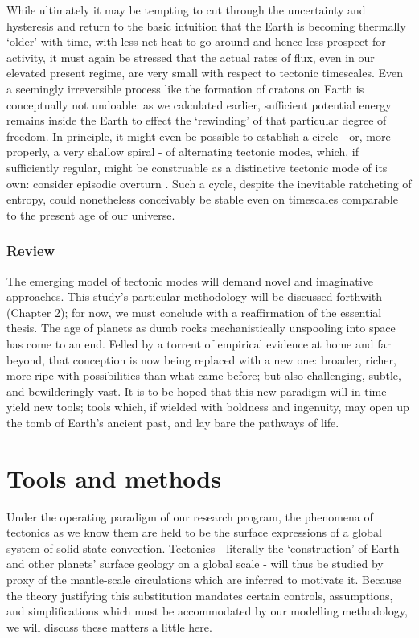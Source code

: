 \documentclass[a4paper,11pt,oneside]{book}
\renewcommand{\section}[1]{\chapter{#1}}
\begin{document}
While ultimately it may be tempting to cut through the uncertainty and hysteresis and return to the basic intuition that the Earth is becoming thermally `older' with time, with less net heat to go around and hence less prospect for activity, it must again be stressed that the actual rates of flux, even in our elevated present regime, are very small with respect to tectonic timescales. Even a seemingly irreversible process like the formation of cratons on Earth is conceptually not undoable: as we calculated earlier, sufficient potential energy remains inside the Earth to effect the `rewinding' of that particular degree of freedom. In principle, it might even be possible to establish a circle - or, more properly, a very shallow spiral - of alternating tectonic modes, which, if sufficiently regular, might be construable as a distinctive tectonic mode of its own: consider episodic overturn \cite{Moresi1998-az}. Such a cycle, despite the inevitable ratcheting of entropy, could nonetheless conceivably be stable even on timescales comparable to the present age of our universe.

\subsection{Review}

The emerging model of tectonic modes will demand novel and imaginative approaches. This study's particular methodology will be discussed forthwith (Chapter 2); for now, we must conclude with a reaffirmation of the essential thesis. The age of planets as dumb rocks mechanistically unspooling into space has come to an end. Felled by a torrent of empirical evidence at home and far beyond, that conception is now being replaced with a new one: broader, richer, more ripe with possibilities than what came before; but also challenging, subtle, and bewilderingly vast. It is to be hoped that this new paradigm will in time yield new tools; tools which, if wielded with boldness and ingenuity, may open up the tomb of Earth's ancient past, and lay bare the pathways of life.

\section{Tools and methods}

Under the operating paradigm of our research program, the phenomena of tectonics as we know them are held to be the surface expressions of a global system of solid-state convection. Tectonics - literally the `construction' of Earth and other planets' surface geology on a global scale - will thus be studied by proxy of the mantle-scale circulations which are inferred to motivate it. Because the theory justifying this substitution mandates certain controls, assumptions, and simplifications which must be accommodated by our modelling methodology, we will discuss these matters a little here.
\end{document}
